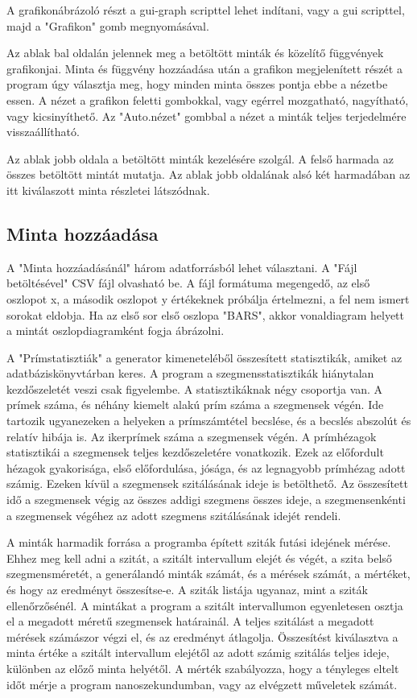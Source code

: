 \documentclass[12pt]{report}
\begin{document}
A grafikonábrázoló részt a gui-graph scripttel lehet indítani,
vagy a gui scripttel, majd a "Grafikon" gomb megnyomásával.

Az ablak bal oldalán jelennek meg a betöltött minták és közelítő függvények
grafikonjai. Minta és függvény hozzáadása után a grafikon megjelenített részét
a program úgy választja meg, hogy minden minta összes pontja ebbe a nézetbe essen.
A nézet a grafikon feletti gombokkal, vagy egérrel mozgatható, nagyítható, vagy
kicsinyíthető.
Az "Auto.nézet" gombbal a nézet a minták teljes terjedelmére visszaállítható.

Az ablak jobb oldala a betöltött minták kezelésére szolgál.
A felső harmada az összes betöltött mintát mutatja.
Az ablak jobb oldalának alsó két harmadában az itt kiválaszott minta részletei
látszódnak.

\subsection{Minta hozzáadása}  %

A "Minta hozzáadásánál" három adatforrásból lehet választani.
A "Fájl betöltésével" CSV fájl olvasható be. A fájl formátuma megengedő,
az első oszlopot x, a második oszlopot y értékeknek próbálja értelmezni,
a fel nem ismert sorokat eldobja. Ha az első sor első oszlopa "BARS",
akkor vonaldiagram helyett a mintát oszlopdiagramként fogja ábrázolni.

A "Prímstatisztiák" a generator kimeneteléből összesített statisztikák,
amiket az adatbáziskönyvtárban keres.
A program a szegmensstatisztikák hiánytalan kezdőszeletét veszi csak figyelembe.
A statisztikáknak négy csoportja van. A prímek száma, és néhány kiemelt alakú prím száma
a szegmensek végén. Ide tartozik ugyanezeken a helyeken a prímszámtétel
becslése, és a becslés abszolút és relatív hibája is.
Az ikerprímek száma a szegmensek végén.
A prímhézagok statisztikái a szegmensek teljes kezdőszeletére vonatkozik. Ezek
az előfordult hézagok gyakorisága, első előfordulása, jósága, és az legnagyobb
prímhézag adott számig.
Ezeken kívül a szegmensek szitálásának ideje is betölthető. Az összesített
idő a szegmensek végig az összes addigi szegmens összes ideje,
a szegmensenkénti a szegmensek végéhez az adott szegmens szitálásának idejét rendeli.

A minták harmadik forrása a programba épített sziták futási idejének mérése.
Ehhez meg kell adni a szitát, a szitált intervallum elejét és végét,
a szita belső szegmensméretét, a generálandó minták számát, és a mérések számát,
a mértéket, és hogy az eredményt összesítse-e.
A sziták listája ugyanaz, mint a sziták ellenőrzősénél.
A mintákat a program a szitált intervallumon egyenletesen osztja el a megadott méretű
szegmensek határainál. A teljes szitálást a megadott mérések számászor végzi el,
és az eredményt átlagolja.
Összesítést kiválasztva a minta értéke a szitált intervallum elejétől
az adott számig szitálás teljes ideje, különben az előző minta helyétől.
A mérték szabályozza, hogy a tényleges eltelt időt mérje a program nanoszekundumban,
vagy az elvégzett műveletek számát.
\end{document}
